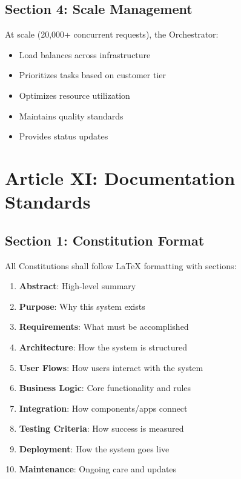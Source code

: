 \documentclass[12pt,letterpaper]{article}
\begin{document}
\subsection{Section 4: Scale Management}

At scale (20,000+ concurrent requests), the Orchestrator:

\begin{itemize}
    \item Load balances across infrastructure
    \item Prioritizes tasks based on customer tier
    \item Optimizes resource utilization
    \item Maintains quality standards
    \item Provides status updates
\end{itemize}

\section{Article XI: Documentation Standards}

\subsection{Section 1: Constitution Format}

All Constitutions shall follow LaTeX formatting with sections:

\begin{enumerate}
    \item \textbf{Abstract}: High-level summary
    \item \textbf{Purpose}: Why this system exists
    \item \textbf{Requirements}: What must be accomplished
    \item \textbf{Architecture}: How the system is structured
    \item \textbf{User Flows}: How users interact with the system
    \item \textbf{Business Logic}: Core functionality and rules
    \item \textbf{Integration}: How components/apps connect
    \item \textbf{Testing Criteria}: How success is measured
    \item \textbf{Deployment}: How the system goes live
    \item \textbf{Maintenance}: Ongoing care and updates
\end{enumerate}
\end{document}

